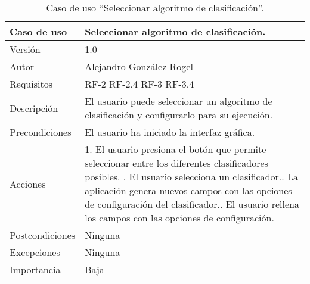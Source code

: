     \begin{table}
  \begin{center}
   \begin{tabular}{|>{} L{3cm} | L{9cm} |}
    \hline
    Caso de uso & Seleccionar algoritmo de clasificación.\\
    \hline
    Versión & 1.0 \\
    \hline
    Autor & Alejandro González Rogel \\
    \hline
    Requisitos & RF-2\newline
    				 RF-2.4\newline
    				 RF-3\newline
    				 RF-3.4 \\
    \hline
    Descripción & El usuario puede seleccionar un algoritmo de clasificación y configurarlo para su ejecución. \\
    \hline
    Precondiciones & El usuario ha iniciado la interfaz gráfica.\\
    \hline
    		Acciones & 1. El usuario presiona el botón que permite seleccionar entre los diferentes clasificadores posibles. . El usuario selecciona un clasificador.. La aplicación genera nuevos campos con las opciones de configuración del clasificador.. El usuario rellena los campos con las opciones de configuración.    \\ 			
    \hline
    Postcondiciones & Ninguna\\
    \hline
    Excepciones & Ninguna \\
    \hline
    Importancia & Baja \\
    \hline
   \end{tabular}
   \caption{Caso de uso ``Seleccionar algoritmo de clasificación''.}
   \label{tabla:casoUso8}
  \end{center}
 \end{table}
 

